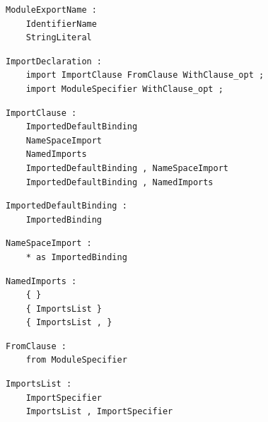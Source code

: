 \noindent\textbf{\texttt{}}\par
\begin{lstlisting}
ModuleExportName :
    IdentifierName
    StringLiteral
\end{lstlisting}

\noindent\textbf{\texttt{}}\par
\begin{lstlisting}
ImportDeclaration :
    import ImportClause FromClause WithClause_opt ;
    import ModuleSpecifier WithClause_opt ;
\end{lstlisting}

\noindent\textbf{\texttt{}}\par
\begin{lstlisting}
ImportClause :
    ImportedDefaultBinding
    NameSpaceImport
    NamedImports
    ImportedDefaultBinding , NameSpaceImport
    ImportedDefaultBinding , NamedImports
\end{lstlisting}

\noindent\textbf{\texttt{}}\par
\begin{lstlisting}
ImportedDefaultBinding :
    ImportedBinding
\end{lstlisting}

\noindent\textbf{\texttt{}}\par
\begin{lstlisting}
NameSpaceImport :
    * as ImportedBinding
\end{lstlisting}

\noindent\textbf{\texttt{}}\par
\begin{lstlisting}
NamedImports :
    { }
    { ImportsList }
    { ImportsList , }
\end{lstlisting}

\noindent\textbf{\texttt{}}\par
\begin{lstlisting}
FromClause :
    from ModuleSpecifier
\end{lstlisting}

\noindent\textbf{\texttt{}}\par
\begin{lstlisting}
ImportsList :
    ImportSpecifier
    ImportsList , ImportSpecifier
\end{lstlisting}

